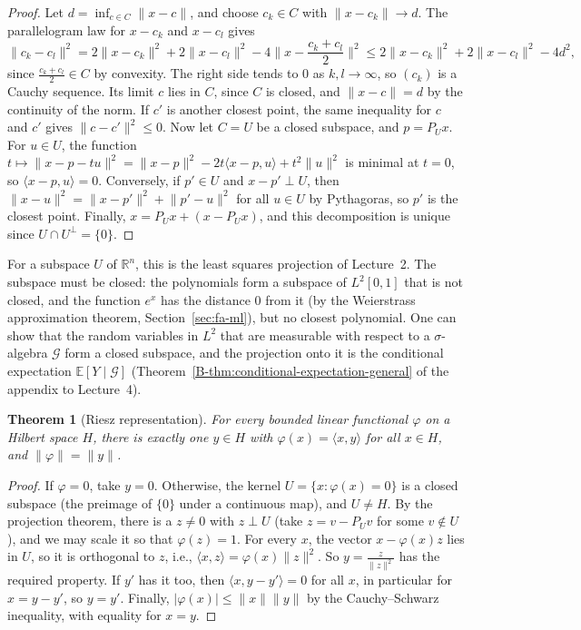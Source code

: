 \documentclass[11pt]{article}
\newcommand{\norm}[1]{\lVert #1 \rVert}
\newcommand{\ip}[2]{\langle #1, #2 \rangle}
\newcommand{\E}{\mathbb{E}}
\theoremstyle{definition}
\theoremstyle{plain}
\newtheorem{theorem}[definition]{Theorem}
\theoremstyle{remark}
\begin{document}
\begin{proof}
    Let $d = \inf_{c \in C}\norm{x - c}$, and choose $c_k \in C$ with $\norm{x - c_k} \to d$. The parallelogram law for $x - c_k$ and $x - c_l$ gives
    \[\norm{c_k - c_l}^2 = 2\norm{x - c_k}^2 + 2\norm{x - c_l}^2 - 4\Big\|x - \frac{c_k + c_l}{2}\Big\|^2 \leq 2\norm{x - c_k}^2 + 2\norm{x - c_l}^2 - 4d^2,\]
    since $\frac{c_k + c_l}{2} \in C$ by convexity. The right side tends to $0$ as $k, l \to \infty$, so $(c_k)$ is a Cauchy sequence. Its limit $c$ lies in $C$, since $C$ is closed, and $\norm{x - c} = d$ by the continuity of the norm. If $c'$ is another closest point, the same inequality for $c$ and $c'$ gives $\norm{c - c'}^2 \leq 0$. Now let $C = U$ be a closed subspace, and $p = P_Ux$. For $u \in U$, the function $t \mapsto \norm{x - p - tu}^2 = \norm{x - p}^2 - 2t\ip{x - p}{u} + t^2\norm{u}^2$ is minimal at $t = 0$, so $\ip{x - p}{u} = 0$. Conversely, if $p' \in U$ and $x - p' \perp U$, then $\norm{x - u}^2 = \norm{x - p'}^2 + \norm{p' - u}^2$ for all $u \in U$ by Pythagoras, so $p'$ is the closest point. Finally, $x = P_Ux + (x - P_Ux)$, and this decomposition is unique since $U \cap U^\perp = \{0\}$.
\end{proof}

For a subspace $U$ of $\mathbb{R}^n$, this is the least squares projection of Lecture~2. The subspace must be closed: the polynomials form a subspace of $L^2[0, 1]$ that is not closed, and the function $e^x$ has the distance $0$ from it (by the Weierstrass approximation theorem, Section~\ref{sec:fa-ml}), but no closest polynomial. One can show that the random variables in $L^2$ that are measurable with respect to a $\sigma$-algebra $\mathcal{G}$ form a closed subspace, and the projection onto it is the conditional expectation $\E[Y \mid \mathcal{G}]$ (Theorem~\ref{B-thm:conditional-expectation-general} of the appendix to Lecture~4).

\begin{theorem}[Riesz representation]\label{thm:riesz}
    For every bounded linear functional $\varphi$ on a Hilbert space $H$, there is exactly one $y \in H$ with $\varphi(x) = \ip{x}{y}$ for all $x \in H$, and $\norm{\varphi} = \norm{y}$.
\end{theorem}

\begin{proof}
    If $\varphi = 0$, take $y = 0$. Otherwise, the kernel $U = \{x : \varphi(x) = 0\}$ is a closed subspace (the preimage of $\{0\}$ under a continuous map), and $U \neq H$. By the projection theorem, there is a $z \neq 0$ with $z \perp U$ (take $z = v - P_Uv$ for some $v \notin U$), and we may scale it so that $\varphi(z) = 1$. For every $x$, the vector $x - \varphi(x)z$ lies in $U$, so it is orthogonal to $z$, i.e., $\ip{x}{z} = \varphi(x)\norm{z}^2$. So $y = \frac{z}{\norm{z}^2}$ has the required property. If $y'$ has it too, then $\ip{x}{y - y'} = 0$ for all $x$, in particular for $x = y - y'$, so $y = y'$. Finally, $|\varphi(x)| \leq \norm{x}\norm{y}$ by the Cauchy--Schwarz inequality, with equality for $x = y$.
\end{proof}
\end{document}
